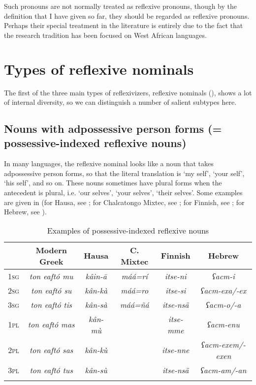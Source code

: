 \documentclass[output=paper]{langscibook}
\begin{document}
Such pronouns are not normally treated as reflexive pronouns, though by the definition that I have given so far, they should be regarded as reflexive pronouns. Perhaps their special treatment in the literature is entirely due to the fact that the research tradition has been focused on West African languages.

\section{Types of reflexive nominals}\label{sec:Haspelmath:6}


The first of the three main types of reflexivizers, reflexive nominals (), shows a lot of internal diversity, so we can distinguish a number of salient subtypes here.
\subsection{Nouns with adpossessive person forms (= possessive-indexed reflexive nouns)}\label{sec:Haspelmath:6.1}


In many languages, the reflexive nominal looks like a noun that takes adpossessive person forms, so that the literal translation is ‘my self’, ‘your self’, ‘his self’, and so on. These nouns sometimes have plural forms when the antecedent is plural, i.e. ‘our selves’, ‘your selves’, ‘their selves’. Some examples are given in  (for Hausa, see \citet{Newman2000}; for Chalcatongo Mixtec, see \citet[144--145]{Macaulay1996}; for Finnish, see \citet[137]{Karlsson1999}; for Hebrew, see \citet[67]{Glinert1989}).

\begin{table}
    \centering
    \begin{tabular}{cccccc}
    \lsptoprule
       & Modern Greek  & Hausa  & C. Mixtec & Finnish  & Hebrew          \\
    \hline 
1\textsc{sg} & \textit{ton eaftó mu}  & \textit{kâin-ā} & \textit{máá=rí}    & \textit{itse-ni}  & \textit{ʕacm-i}          \\
2\textsc{sg} & \textit{ton eaftó su}  & \textit{kân-kà} & \textit{máá=ro}    & \textit{itse-si}  & \textit{ʕacm-exa/-ex}    \\
3\textsc{sg} & \textit{ton eaftó tis} & \textit{kân-sà} & \textit{máá=ñá}    & \textit{itse-nsä} & \textit{ʕacm-o/-a}       \\
1\textsc{pl} & \textit{ton eaftó mas} & \textit{kân-mù} &           &\textit{itse-mme} & \textit{ʕacm-enu}        \\
2\textsc{pl} & \textit{ton eaftó sas} & \textit{kân-kù} &           & \textit{itse-nne} & \textit{ʕacm-exem/-exen} \\
3\textsc{pl} & \textit{ton eaftó tus} & \textit{kân-sù} &           & \textit{itse-nsä} & \textit{ʕacm-am/-an}    \\
\lspbottomrule
    \end{tabular}
    \caption{Examples of possessive-indexed reflexive nouns}\label{tab:Haspelmath:1}
\end{table}
\end{document}
